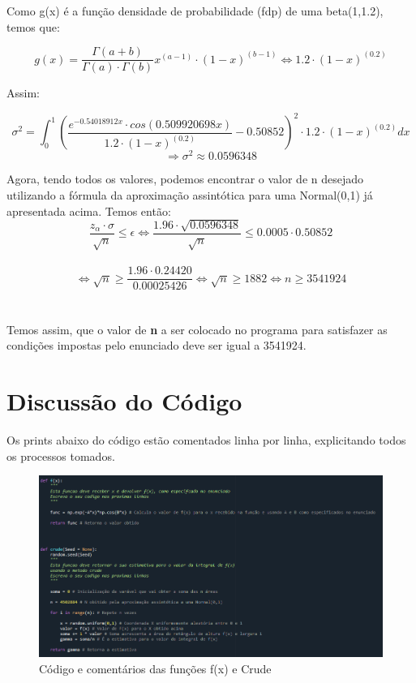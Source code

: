 \documentclass{article}
\begin{document}
Como g(x) é a função densidade de probabilidade (fdp) de uma beta(1,1.2), temos que:

$$ g(x)=\frac{\Gamma(a+b)}{\Gamma(a)\cdot \Gamma(b)} x^{(a-1)}\cdot (1-x)^{(b-1)} \Leftrightarrow1.2 \cdot (1-x)^{(0.2)}$$

Assim:

$$ \sigma^2 = \int_{0}^{1} (\frac{e^{-0.54018912x}\cdot cos(0.509920698x)}{1.2 \cdot (1-x)^{(0.2)}}-0.50852)^2\cdot 1.2 \cdot (1-x)^{(0.2)} dx$$
$$ \Rightarrow \sigma^2 \approx 0.0596348 $$

Agora, tendo todos os valores, podemos encontrar o valor de n desejado utilizando a fórmula da aproximação assintótica para uma Normal(0,1) já apresentada acima. Temos então:\\
    
    $$\frac{z_\alpha \cdot \sigma}{\sqrt{n}} \leq \epsilon \Leftrightarrow \frac{1.96 \cdot\sqrt{0.0596348}}{\sqrt{n}} \leq 0.0005\cdot 0.50852$$\\
    
    $$\Leftrightarrow \sqrt{n}\geq \frac{1.96\cdot 0.24420}{0.00025426}\Leftrightarrow \sqrt{n}\geq 1882 \Leftrightarrow n\geq 3541924$$\\
    \\
    Temos assim, que o valor de \textbf{n} a ser colocado no programa para satisfazer as condições impostas pelo enunciado deve ser igual a 3541924.

\section{Discussão do Código}

Os prints abaixo do código estão comentados linha por linha, explicitando todos os processos tomados.

    \begin{figure}[H]
        \centering
        \includegraphics[width= 1 \textwidth]{Código f(x) e crude.png}
        \caption{Código e comentários das funções f(x) e Crude}
        \label{fig:grafico}
    \end{figure}
    
\end{document}
